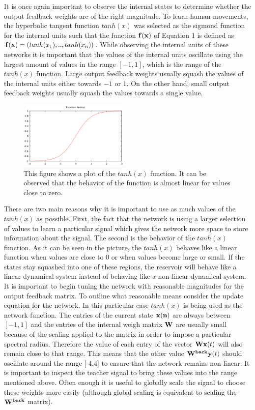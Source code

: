 \documentclass[letterpaper,9pt]{article}
\begin{document}
It is once again important to observe the internal states to determine whether the output feedback weights are of the right magnitude. To learn human movements, the hyperbolic tangent function $tanh(x)$ was selected as the sigmond function for the internal units such that the function ${\bf f(x)}$ of Equation 1 is defined as ${\bf f(x)} = (tanh(x_1),..,tanh(x_n))$. While observing the internal units of these networks it is important that the values of the internal units oscillate using the largest amount of values in the range $[-1,1]$, which is the range of the $tanh(x)$ function. Large output feedback weights usually squash the values of the internal units either towards $-1$ or $1$. On the other hand, small output feedback weights usually squash the values towards a single value.

\begin{figure}[h!]
  \centering
  \includegraphics[height=125px]{Extra/tanh.png}
    \caption[Plot of $tanh(x)$ Function]{This figure shows a plot of the $tanh(x)$ function. It can be observed that the behavior of the function is almost linear for values close to zero.}
\end{figure}


There are two main reasons why it is important to use as much values of the $tanh(x)$ as possible. First, the fact that the network is using a larger selection of values to learn a particular signal which gives the network more space to store information about the signal. The second is the behavior of the $tanh(x)$ function. As it can be seen in the picture, the $tanh(x)$ behaves like a linear function when values are close to 0 or when values become large or small. If the states stay squashed into one of these regions, the reservoir will behave like a linear dynamical system instead of behaving like a non-linear dynamical system.\\

It is important to begin tuning the network with reasonable magnitudes for the output feedback matrix. To outline what reasonable means consider the update equation for the network. In this particular case $tanh(x)$ is being used as the network function. The entries of the current state ${\bf x(n)}$ are always between $[-1,1]$ and the entries of the internal weigh matrix ${\bf W}$ are usually small because of the scaling applied to the matrix in order to impose a particular spectral radius. Therefore the value of each entry of the vector ${\bf Wx}(t)$ will also remain close to that range. This means that the other value ${\bf W^{back}y}(t)$ should oscillate around the range [-4,4] to ensure that the network remains non-linear. It is important to inspect the teacher signal to bring these values into the range mentioned above. Often enough it is useful to globally scale the signal to choose these weights more easily (although global scaling is equivalent to scaling the ${\bf W^{back}}$ matrix).
\end{document}
